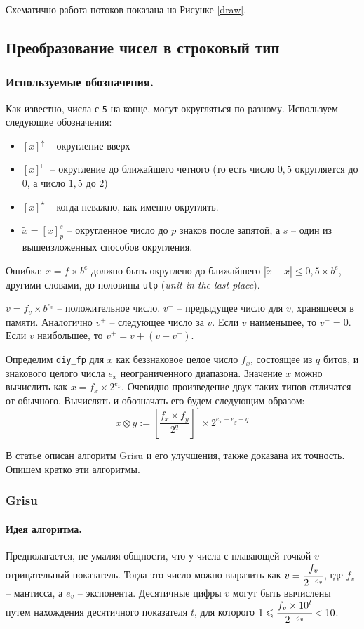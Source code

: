 \documentclass[a4paper, 12pt, twoside]{article}
\begin{document}
Схематично работа потоков показана на Рисунке \ref{draw}.

\subsection{Преобразование чисел в строковый тип}
\subsubsection{Используемые обозначения.}
Как известно, числа с \texttt{5} на конце, могут округляться по-разному.
Используем следующие обозначения:
\begin{itemize}
\item $[x]^\uparrow$ -- округление вверх
\item $[x]^\Box$ -- округление до ближайшего четного (то есть число $0,5$ округляется до $0$, а число $1,5$ до $2$)
\item $[x]^\star$ -- когда неважно, как именно округлять.
\item $\tilde x = \left[ x \right]_p^s$ -- округленное число до $p$ знаков после запятой, а $s$ -- один из вышеизложенных способов округления.
\end{itemize}

Ошибка: $x=f \times b^e$ должно быть округлено до ближайшего $|\tilde x - x| \leqslant 0,5 \times b^e$, другими словами, до половины \texttt{ulp} (\textit{unit in the last place}).

$v=f_v \times b^{e_v}$ -- положительное число.
$v^{-}$ -- предыдущее число для $v$, хранящееся в памяти.
Аналогично $v^{+}$ -- следующее число за $v$.
Если $v$ наименьшее, то $v^{-} = 0$.
Если $v$ наибольшее, то $v^{+} = v + (v - v^{-})$.


Определим \texttt{diy\_fp} для $x$ как беззнаковое целое число $f_x$, состоящее из $q$ битов, и знакового целого числа $e_x$ неограниченного диапазона. 
Значение $x$ можно вычислить как $x= f_x \times 2^{e_x}$.
Очевидно произведение двух таких типов отличатся от обычного.
Вычислять и обозначать его будем следующим образом:
$$x \otimes y := \left[ \frac{f_x \times f_y}{2^q}\right]^\uparrow \times 2^{e_x+e_y+q}$$

В статье \cite{1} описан алгоритм \textsf{Grisu} и его улучшения, также доказана их точность.
Опишем кратко эти алгоритмы.
\subsubsection{\textsf{Grisu}}
\paragraph{Идея алгоритма.}
Предполагается, не умаляя общности, что у числа с плавающей точкой $v$ отрицательный показатель. 
Тогда это число можно выразить как $v=\cfrac{f_v}{2^{-e_v}}$, где $f_v$ -- мантисса, а $e_v$ -- экспонента. 
Десятичные цифры $v$ могут быть вычислены путем нахождения десятичного показателя $t$, для которого $1 \leqslant \cfrac{f_v \times 10^t}{2^{-e_v}} < 10$.
\end{document}
